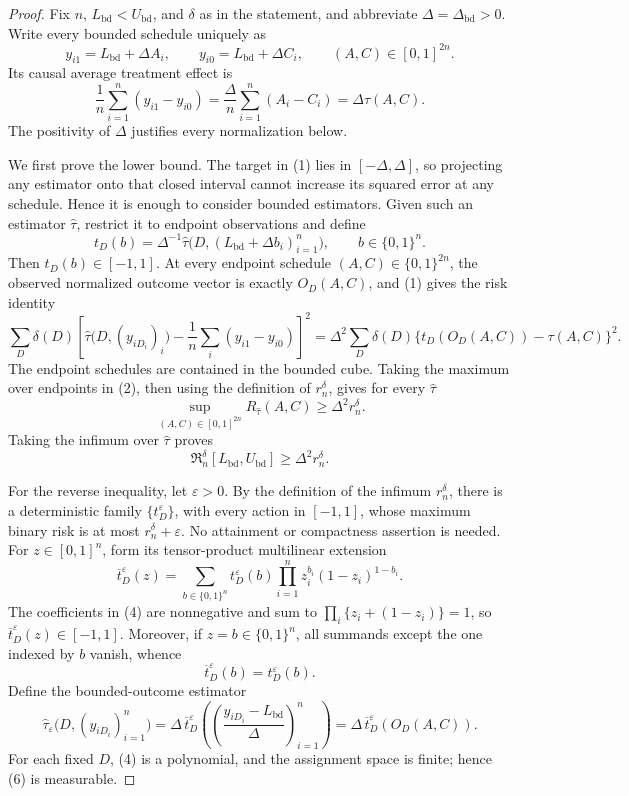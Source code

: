\documentclass{article}
\begin{document}
\begin{proof}
Fix \(n\), \(L_{\mathrm{bd}}<U_{\mathrm{bd}}\), and \(\delta\) as in the statement, and abbreviate \(\Delta=\Delta_{\mathrm{bd}}>0\).  Write every bounded schedule uniquely as
\[
 y_{i1}=L_{\mathrm{bd}}+\Delta A_i,
 \qquad y_{i0}=L_{\mathrm{bd}}+\Delta C_i,
 \qquad (A,C)\in[0,1]^{2n}.
\]
Its causal average treatment effect is
\[
 \frac1n\sum_{i=1}^n(y_{i1}-y_{i0})
 =\frac{\Delta}{n}\sum_{i=1}^n(A_i-C_i)
 =\Delta\tau(A,C). \tag{1}
\]
The positivity of \(\Delta\) justifies every normalization below.

We first prove the lower bound.  The target in (1) lies in \([-\Delta,\Delta]\), so projecting any estimator onto that closed interval cannot increase its squared error at any schedule.  Hence it is enough to consider bounded estimators.  Given such an estimator \(\widehat\tau\), restrict it to endpoint observations and define
\[
 t_D(b)=\Delta^{-1}\widehat\tau
 \bigl(D,(L_{\mathrm{bd}}+\Delta b_i)_{i=1}^n\bigr),
 \qquad b\in\{0,1\}^n.
\]
Then \(t_D(b)\in[-1,1]\).  At every endpoint schedule \((A,C)\in\{0,1\}^{2n}\), the observed normalized outcome vector is exactly \(O_D(A,C)\), and (1) gives the risk identity
\[
 \sum_D\delta(D)
 \left[\widehat\tau\bigl(D,(y_{iD_i})_i\bigr)
       -\frac1n\sum_i(y_{i1}-y_{i0})\right]^2
 =\Delta^2\sum_D\delta(D)
 \{t_D(O_D(A,C))-\tau(A,C)\}^2. \tag{2}
\]
The endpoint schedules are contained in the bounded cube.  Taking the maximum over endpoints in (2), then using the definition of \(r_n^\delta\), gives for every \(\widehat\tau\)
\[
 \sup_{(A,C)\in[0,1]^{2n}}R_{\widehat\tau}(A,C)
 \geq \Delta^2 r_n^\delta.
\]
Taking the infimum over \(\widehat\tau\) proves
\[
 \mathfrak R_n^\delta[L_{\mathrm{bd}},U_{\mathrm{bd}}]
 \geq\Delta^2 r_n^\delta. \tag{3}
\]

For the reverse inequality, let \(\varepsilon>0\).  By the definition of the infimum \(r_n^\delta\), there is a deterministic family \(\{t_D^\varepsilon\}\), with every action in \([-1,1]\), whose maximum binary risk is at most \(r_n^\delta+\varepsilon\).  No attainment or compactness assertion is needed.  For \(z\in[0,1]^n\), form its tensor-product multilinear extension
\[
 \overline t_D^\varepsilon(z)
 =\sum_{b\in\{0,1\}^n}t_D^\varepsilon(b)
   \prod_{i=1}^n z_i^{b_i}(1-z_i)^{1-b_i}. \tag{4}
\]
The coefficients in (4) are nonnegative and sum to
\(
 \prod_i\{z_i+(1-z_i)\}=1
\), so \(\overline t_D^\varepsilon(z)\in[-1,1]\).  Moreover, if \(z=b\in\{0,1\}^n\), all summands except the one indexed by \(b\) vanish, whence
\[
 \overline t_D^\varepsilon(b)=t_D^\varepsilon(b). \tag{5}
\]
Define the bounded-outcome estimator
\[
 \widehat\tau_\varepsilon
 \bigl(D,(y_{iD_i})_{i=1}^n\bigr)
 =\Delta\,\overline t_D^\varepsilon
 \left(\left(\frac{y_{iD_i}-L_{\mathrm{bd}}}{\Delta}\right)_{i=1}^n\right)
 =\Delta\,\overline t_D^\varepsilon(O_D(A,C)). \tag{6}
\]
For each fixed \(D\), (4) is a polynomial, and the assignment space is finite; hence (6) is measurable.


\end{proof}
\end{document}
